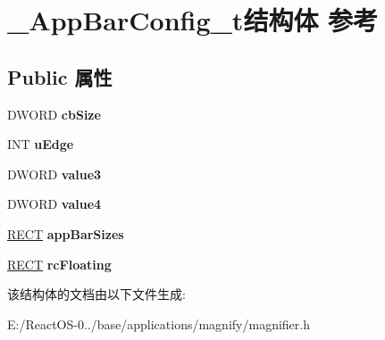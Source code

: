 \hypertarget{struct___app_bar_config__t}{}\section{\+\_\+\+App\+Bar\+Config\+\_\+t结构体 参考}
\label{struct___app_bar_config__t}
\subsection*{Public 属性}
\begin{DoxyCompactItemize}
\item 
\mbox{\label{struct___app_bar_config__t_a99de90cc9697e87972de0ed0f890fa77}} 
D\+W\+O\+RD {\bfseries cb\+Size}
\item 
\mbox{\label{struct___app_bar_config__t_ad6a222910542bdff4e9f39f1b7d92f2e}} 
I\+NT {\bfseries u\+Edge}
\item 
\mbox{\label{struct___app_bar_config__t_a2e3966088658af7a53c6e9cfcd70f171}} 
D\+W\+O\+RD {\bfseries value3}
\item 
\mbox{\label{struct___app_bar_config__t_a0be1daef3dfeea1261b581812748e7b0}} 
D\+W\+O\+RD {\bfseries value4}
\item 
\mbox{\label{struct___app_bar_config__t_aad3478de01c56b5b706cc9811ad56250}} 
\hyperlink{structtag_r_e_c_t}{R\+E\+CT} {\bfseries app\+Bar\+Sizes}
\item 
\mbox{\label{struct___app_bar_config__t_a7beb221d5141f8f3fe2b1b85d1da6814}} 
\hyperlink{structtag_r_e_c_t}{R\+E\+CT} {\bfseries rc\+Floating}
\end{DoxyCompactItemize}


该结构体的文档由以下文件生成\+:\begin{DoxyCompactItemize}
\item 
E\+:/\+React\+O\+S-\/0../base/applications/magnify/magnifier.\+h\end{DoxyCompactItemize}

